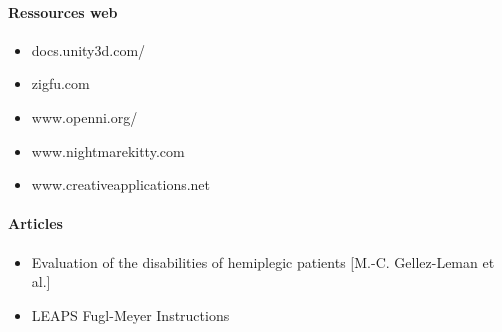 \paragraph{Ressources web}
  \begin{itemize}
	\item docs.unity3d.com/
    \item zigfu.com
    \item www.openni.org/
    \item www.nightmarekitty.com 
    \item www.creativeapplications.net
  \end{itemize}
  
\paragraph{Articles}
  \begin {itemize}
    \item Evaluation of the disabilities of hemiplegic patients [M.-C. Gellez-Leman et al.] \label{ref_analyse_litterature}
    \item LEAPS Fugl-Meyer Instructions
  \end{itemize}
        
        
        
